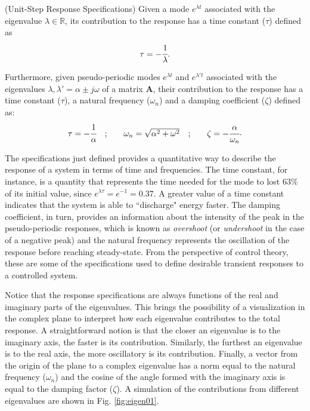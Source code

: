 \documentclass[a4paper,11pt]{book}
\numberwithin{figure}{chapter}
\numberwithin{equation}{chapter}
\numberwithin{table}{chapter}
\theoremstyle{definition}
\newtheorem{definition}{Definition}[chapter]
\newcounter{boxed-theorem}
\newcounter{boxed-lemma}
\newcounter{boxed-definition}
\newenvironment{boxed-definition}[1]
{\colorlet{shadecolor}{pastelYellow!15} \begin{shaded} \begin{definition}{#1}}
{\end{definition} \end{shaded}}
\newcounter{boxed-example}
\begin{document}
\begin{boxed-definition}{(Unit-Step Response Specifications)} \label{def:responseParameters}
    Given a mode $e^{\lambda t}$ associated with the eigenvalue $\lambda \in \mathbb{R}$, its contribution to the response has a time constant ($\tau$) defined as
    \begin{equation}
        \tau = - \cfrac{1}{\lambda}
    .\end{equation}  
    
    Furthermore, given pseudo-periodic modes $e^{\lambda t}$ and $e^{\lambda' t}$ associated with the eigenvalues $\lambda,\lambda' = \alpha \pm j \omega$ of a matrix $\bm{A}$, their contribution to the response has a time constant ($\tau$), a natural frequency ($\omega_n$) and a damping coefficient ($\zeta$) defined as:
    \begin{equation}
    \begin{matrix}
        \tau = - \cfrac{1}{\alpha} &; & & \omega_n = \sqrt{\alpha^2 + \omega^2} &; & & \zeta = - \cfrac{\alpha}{\omega_n}
    \end{matrix}
    .\end{equation}
    
\end{boxed-definition}   

The specifications just defined provides a quantitative way to describe the response of a system in terms of time and frequencies. The time constant, for instance, is a quantity that represents the time needed for the mode to lost $63\%$ of its initial value, since $e^{\lambda \tau} = e^{-1} = 0.37$. A greater value of a time constant indicates that the system is able to ``discharge" energy faster. The damping coefficient, in turn, provides an information about the intensity of the peak in the pseudo-periodic responses, which is known as \textit{overshoot} (or \textit{undershoot} in the case of a negative peak) and the natural frequency represents the oscillation of the response before reaching steady-state. From the perspective of control theory, these are some of the specifications used to define desirable transient responses to a controlled system.

Notice that the response specifications are always functions of the real and imaginary parts of the eigenvalues. This brings the possibility of a visualization in the complex plane to interpret how each eigenvalue contributes to the total response. A straightforward notion is that the closer an eigenvalue is to the imaginary axis, the faster is its contribution. Similarly, the furthest an eigenvalue is to the real axis, the more oscillatory is its contribution. Finally, a vector from the origin of the plane to a complex eigenvalue has a norm equal to the natural frequency ($\omega_n$) and the cosine of the angle formed with the imaginary axis is equal to the damping factor ($\zeta$). A simulation of the contributions from different eigenvalues are shown in Fig. \ref{fig:eigen01}.
\end{document}
